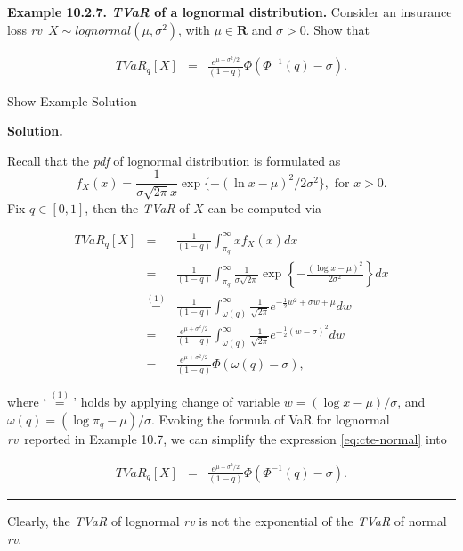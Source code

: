 \documentclass[]{book}
\theoremstyle{definition}
\theoremstyle{definition}
\theoremstyle{definition}
\theoremstyle{remark}
\begin{document}
\textbf{Example 10.2.7. \emph{TVaR} of a lognormal distribution.}
Consider an insurance loss \emph{rv}~\(X\sim lognormal (\mu,\sigma^2)\),
with \(\mu\in \mathbf{R}\) and \(\sigma>0\). Show that

\begin{eqnarray*}
  TVaR_q[X] &=& \frac{e^{\mu+\sigma^2/2}}{(1-q)} \Phi(\Phi^{-1}(q)-\sigma).
\end{eqnarray*}

Show Example Solution

\hypertarget{toggleExamplePortMgt.2.7}{}
\textbf{Solution.}

Recall that the \emph{pdf} of lognormal distribution is formulated as \[
f_X(x)=\frac{1}{\sigma\sqrt{2\pi} x}\exp\{-(\ln x-\mu )^2/2\sigma^2 \}, \text{ for } x>0.
\] Fix \(q\in[0,1]\), then the \emph{TVaR} of \(X\) can be computed via

\begin{eqnarray}
  TVaR_q[X] &=& \frac{1}{(1-q)} \int_{\pi_q}^{\infty} x f_X(x)dx \nonumber\\
&=&\frac{1}{(1-q)} \int_{\pi_q}^{\infty} \frac{1}{\sigma \sqrt{2\pi}} \exp\left\{ -\frac{(\log x-\mu)^2}{2\sigma^2}
\right\}dx\nonumber\\
&\overset{(1)}{=}&\frac{1}{(1-q)} \int_{\omega(q)}^{\infty} \frac{1}{\sqrt{2\pi}} e^{ -\frac{1}{2}w^2+\sigma w+\mu}dw\nonumber\\
&=&\frac{e^{\mu+\sigma^2/2}}{(1-q)} \int_{\omega(q)}^{\infty} \frac{1}{\sqrt{2\pi}} e^{ -\frac{1}{2}(w-\sigma)^2}dw\nonumber\\
&=&\frac{e^{\mu+\sigma^2/2}}{(1-q)} \Phi(\omega(q)-\sigma),
\label{eq:cte-normal}
\end{eqnarray}

where `\(\overset{(1)}{=}\)' holds by applying change of variable
\(w=(\log x-\mu)/\sigma\), and \(\omega(q)=(\log \pi_q-\mu)/\sigma\).
Evoking the formula of VaR for lognormal \emph{rv}~reported in Example
10.7, we can simplify the expression \eqref{eq:cte-normal} into

\begin{eqnarray*}
  TVaR_q[X] &=& \frac{e^{\mu+\sigma^2/2}}{(1-q)} \Phi(\Phi^{-1}(q)-\sigma).
\end{eqnarray*}

\begin{center}\rule{0.5\linewidth}{\linethickness}\end{center}

Clearly, the \emph{TVaR} of lognormal \emph{rv} is not the exponential
of the \emph{TVaR} of normal \emph{rv}.
\end{document}
